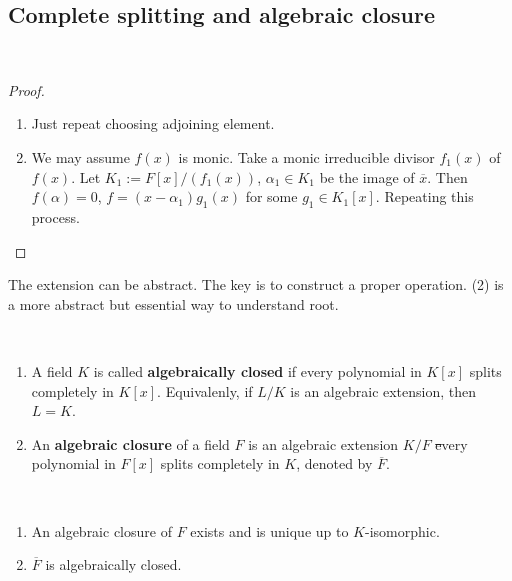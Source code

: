 \subsection{Complete splitting and algebraic closure}
\begin{proposition}
    \,
\end{proposition}
\begin{proof}
    \begin{enumerate}[(1)]
        \item Just repeat choosing adjoining element.
        \item We may assume  $ f(x)  $ is monic. Take a monic irreducible divisor  $ f_1(x) $  of  $ f(x) $. Let  $ K_1:=F[x]/(f_1(x)) $,  $ \alpha_1\in K_1 $ be the image of  $ \overline{x} $. Then  $ f(\alpha)=0 $,  $ f=(x-\alpha_1)g_1(x) $ for some  $ g_1\in  K_1[x] $. Repeating this process.    
    \end{enumerate}
\end{proof}
\begin{remark}
    The extension can be abstract. The key is to construct a proper operation. (2) is a more abstract but essential way to understand root.
\end{remark}
\begin{definition}
    \,
    \begin{enumerate}[(1)]
        \item A field  $ K  $ is called \textbf{algebraically closed} if every polynomial in  $ K[x] $ splits completely in  $ K[x] $. Equivalenly, if  $ L/K $ is an algebraic extension, then  $ L=K $.
        \item An \textbf{algebraic closure} of a field  $ F  $ is an algebraic extension  $ K/F  $ \st every polynomial in  $ F[x] $ splits completely in  $ K  $, denoted by  $ \overline{F} $.  
    \end{enumerate}
\end{definition}
\begin{fact}
    \,
    \begin{enumerate}[(1)]
        \item An algebraic closure of  $ F  $ exists and is unique up to  $ K  $-isomorphic.
        \item  $ \overline{F} $ is algebraically closed. 
    \end{enumerate}
\end{fact}
